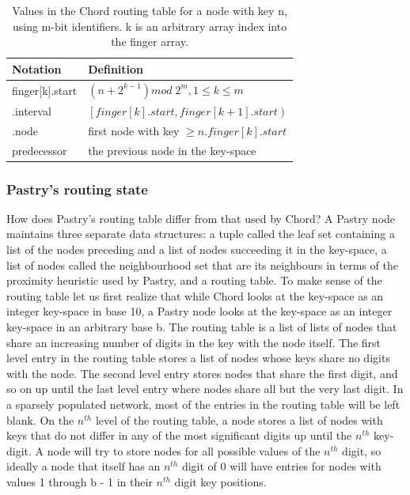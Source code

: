 \begin{table}[h]
\caption{Values in the Chord routing table for a node with key n, using m-bit identifiers. k is an arbitrary array index into the finger array.}
\begin{center}
\begin{tabular}{ | l | l | }
  \hline                       
  Notation & Definition \\
  \hline  
  \hline  
  finger[k].start & $\left( n + 2^{k - 1} \right) mod \; 2^{m} , 1 \leq k \leq m $ \\
  \hline  
  \;.interval & $ \left[ finger[k].start, finger[k+1].start \right) $ \\
  \hline  
  \;.node & first node with key $ \geq n.finger[k].start $ \\
  \hline  
  predecessor & the previous node in the key-space \\
  \hline  
\end{tabular}
\end{center}
\label{tableChordRoutingTable}
\end{table}


\subsubsection{Pastry's routing state}
\label{sec:pastryRoutingState}
How does Pastry's routing table differ from that used by Chord?
A Pastry node maintains three separate data structures: a tuple called the leaf set containing a list of the nodes preceding and a list of nodes succeeding it in the key-space, a list of nodes called the neighbourhood set that are its neighbours in terms of the proximity heuristic used by Pastry, and a routing table. 
To make sense of the routing table let us first realize that while Chord looks at the key-space as an integer key-space in base 10, a Pastry node looks at the key-space as an integer key-space in an arbitrary base b.
The routing table is a list of lists of nodes that share an increasing number of digits in the key with the node itself. The first level entry in the routing table stores a list of nodes whose keys share no digits with the node. The second level entry stores nodes that share the first digit, and so on up until the last level entry where nodes share all but the very last digit.
In a sparsely populated network, most of the entries in the routing table will be left blank.
On the $ n^{th} $ level of the routing table, a node stores a list of nodes with keys that do not differ in any of the most significant digits up until the $ n^{th} $ key-digit.
A node will try to store nodes for all possible values of the $ n^{th} $ digit, so ideally a node that itself has an $ n^{th} $ digit of 0 will have entries for nodes with values 1 through b - 1 in their $ n^{th} $ digit key positions.

